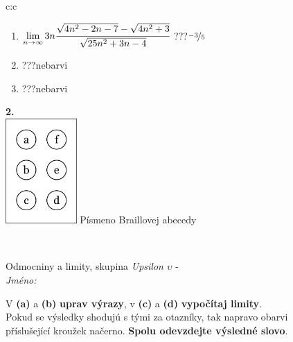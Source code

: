 \documentclass[10pt]{report}
\begin{document}
\begin{tabular}{c:c}
\begin{minipage}[c][104.5mm][t]{0.5\linewidth}
\begin{center}
\begin{minipage}{0.79\linewidth}
\begin{center}
\begin{varwidth}{\linewidth}
\begin{enumerate}
\item $\lim\limits_{n\to\infty}3n\cfrac{\sqrt{4n^2-2n-7}-\sqrt{4n^2+3}}{\sqrt{25n^2+3n-4}}$\quad \dotfill\; ???\;\dotfill \quad $\nicefrac{-3}{5}$
\item \quad \dotfill\; ???\;\dotfill \quad nebarvi
\item \quad \dotfill\; ???\;\dotfill \quad nebarvi
\end{enumerate}
\end{varwidth}
\end{center}
\end{minipage}
\begin{minipage}{0.20\linewidth}
\begin{center}
{\Huge\bfseries 2.} \\[2mm]
\includegraphics[height=40mm]{../images/braille.png}
{\small Písmeno Braillovej abecedy}
\end{center}
\end{minipage}
\end{center}
\end{minipage}
\\ \hdashline
\begin{minipage}[c][104.5mm][t]{0.5\linewidth}
\begin{center}
\vspace{7mm}
{\huge Odmocniny a limity, skupina \textit{Upsilon $\upsilon$} -}\\[5mm]
\textit{Jméno:}\phantom{xxxxxxxxxxxxxxxxxxxxxxxxxxxxxxxxxxxxxxxxxxxxxxxxxxxxxxxxxxxxxxxxx}\\[5mm]
\begin{minipage}{0.95\linewidth}
\begin{center}
V \textbf{(a)} a \textbf{(b)} \textbf{uprav výrazy}, v \textbf{(c)} a \textbf{(d)} \textbf{vypočítaj limity}.\\Pokud se výsledky shodujú s tými za otazníky, tak napravo obarvi\\příslušející kroužek načerno. \textbf{Spolu odevzdejte výsledné slovo}.
\end{center}
\end{minipage}
\\[1mm]

\end{center}
\end{minipage}
\end{tabular}
\end{document}
